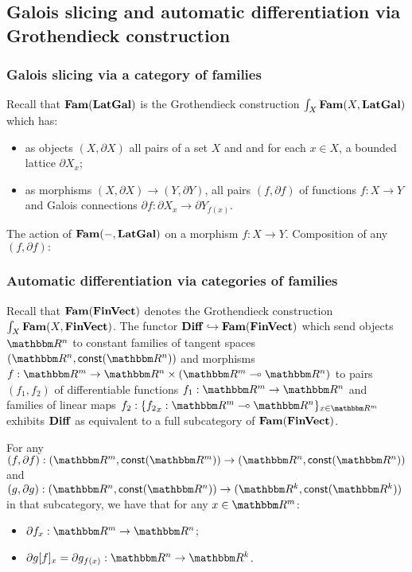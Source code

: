 \subsection{Galois slicing and automatic differentiation via Grothendieck construction}
\label{sec:galois-slicing-auto-diff-via-grothendieck}

\subsubsection{Galois slicing via a category of families}
\label{sec:galois-slicing-auto-diff-via-grothendieck:galois-slicing}

Recall that $\mathbf{Fam}(\mathbf{LatGal})$ is the Grothendieck construction $\int_{X}\mathbf{Fam}(X, \mathbf{LatGal})$ which has:
\begin{itemize}
\item as objects $(X, \partial X)$ all pairs of a set $X$ and and for each $x \in X$, a bounded lattice
$\partial X_x$;
\item as morphisms $(X, \partial X) \to (Y, \partial Y)$, all pairs $(f, \partial f)$ of functions $f: X \to
Y$ and Galois connections $\partial f: \partial X_x \to \partial Y_{f(x)}$.
\end{itemize}

The action of $\mathbf{Fam}(-,\mathbf{LatGal})$ on a morphism $f: X \to Y$. Composition of any $(f, \partial f):$

\subsubsection{Automatic differentiation via categories of families}
\label{sec:galois-slicing-auto-diff-via-grothendieck:auto-diff}

Recall that $\mathbf{Fam}(\mathbf{FinVect})$ denotes the Grothendieck construction $\int_{X}\mathbf{Fam}(X, \mathbf{FinVect})$. The
functor $\mathbf{Diff} \hookrightarrow \mathbf{Fam}(\mathbf{FinVect})$ which send objects $\RR^n$ to constant families of tangent
spaces $(\RR^n, \const(\RR^n))$ and morphisms $f: \RR^m \to \RR^n \times (\RR^m \linearto \RR^n)$ to pairs
$(f_1, f_2)$ of differentiable functions $f_1: \RR^m \to \RR^n$ and families of linear maps $f_2: \{{f_2}_x:
\RR^m \linearto \RR^n\}_{x \in \RR^m}$ exhibits $\mathbf{Diff}$ as equivalent to a full subcategory of
$\mathbf{Fam}(\mathbf{FinVect})$.

For any $(f, \partial f): (\RR^m, \const(\RR^m)) \to (\RR^n, \const(\RR^n))$ and $(g, \partial g): (\RR^n,
\const(\RR^n)) \to (\RR^k, \const(\RR^k))$ in that subcategory, we have that for any $x \in \RR^m$:
\begin{itemize}
\item $\partial f_x: \RR^m \to \RR^n$;
\item $\reindex{\partial g}{f}_x = \partial g_{f(x)}: \RR^n \to \RR^k$.
\end{itemize}

